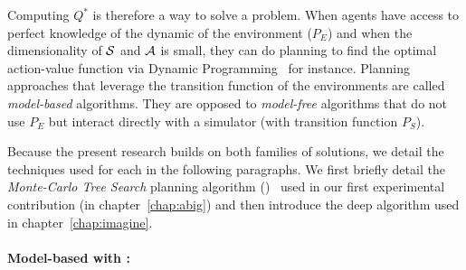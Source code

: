 Computing $Q^*$ is therefore a way to solve a \rl problem. When agents have access to perfect knowledge of the dynamic of the environment ($P_E$) and when the dimensionality of $\mathcal{S}$ and $\mathcal{A}$ is small, they can do planning to find the optimal action-value function via Dynamic Programming~\citep{bellman1966dynamic} for instance. Planning approaches that leverage the transition function of the environments are called \textit{model-based} \rl algorithms. They are opposed to \textit{model-free} \rl algorithms that do not use $P_E$ but interact directly with a simulator (with transition function $P_S$).

Because the present research builds on both families of solutions, we detail the techniques used for each in the following paragraphs. We first briefly detail the \textit{Monte-Carlo Tree Search} planning algorithm (\mcts)~\citep{browne2012mcts} used in our first experimental contribution (in chapter~\ref{chap:abig}) and then introduce the deep \rl algorithm used in chapter~\ref{chap:imagine}.

\paragraph{Model-based \rl with \mcts:}

